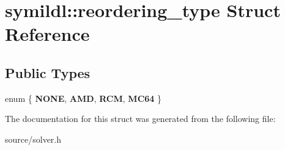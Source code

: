 \hypertarget{structsymildl_1_1reordering__type}{}\section{symildl\+:\+:reordering\+\_\+type Struct Reference}
\label{structsymildl_1_1reordering__type}
\subsection*{Public Types}
\begin{DoxyCompactItemize}
\item 
enum \{ {\bfseries N\+O\+NE}, 
{\bfseries A\+MD}, 
{\bfseries R\+CM}, 
{\bfseries M\+C64}
 \}\hypertarget{structsymildl_1_1reordering__type_a15bef705046fd3e98a4d473b54541081}{}\label{structsymildl_1_1reordering__type_a15bef705046fd3e98a4d473b54541081}

\end{DoxyCompactItemize}


The documentation for this struct was generated from the following file\+:\begin{DoxyCompactItemize}
\item 
source/solver.\+h\end{DoxyCompactItemize}
